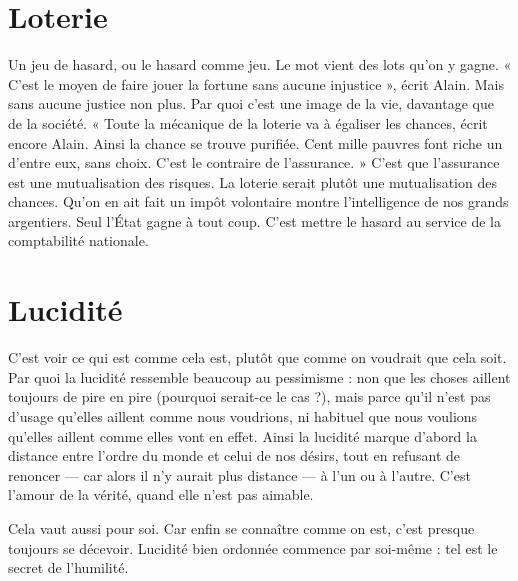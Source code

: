 {\section{Loterie}
Un jeu de hasard, ou le hasard comme jeu. Le mot vient des lots
qu’on y gagne. « C’est le moyen de faire jouer la fortune sans
aucune injustice », écrit Alain. Mais sans aucune justice non plus. Par quoi c’est
une image de la vie, davantage que de la société. « Toute la mécanique de la
loterie va à égaliser les chances, écrit encore Alain. Ainsi la chance se trouve
purifiée. Cent mille pauvres font riche un d’entre eux, sans choix. C’est le
contraire de l'assurance. » C’est que l’assurance est une mutualisation des
risques. La loterie serait plutôt une mutualisation des chances. Qu’on en ait fait
un impôt volontaire montre l'intelligence de nos grands argentiers. Seul l’État
gagne à tout coup. C’est mettre le hasard au service de la comptabilité nationale.

\section{Lucidité}
C'est voir ce qui est comme cela est, plutôt que comme on voudrait
que cela soit. Par quoi la lucidité ressemble beaucoup au
pessimisme : non que les choses aillent toujours de pire en pire (pourquoi
serait-ce le cas ?), mais parce qu’il n’est pas d’usage qu’elles aillent comme nous
voudrions, ni habituel que nous voulions qu’elles aillent comme elles vont en
effet. Ainsi la lucidité marque d’abord la distance entre l’ordre du monde et
celui de nos désirs, tout en refusant de renoncer — car alors il n’y aurait plus distance
— à l’un ou à l’autre. C’est l'amour de la vérité, quand elle n’est pas
aimable.

Cela vaut aussi pour soi. Car enfin se connaître comme on est, c’est presque
toujours se décevoir. Lucidité bien ordonnée commence par soi-même : tel est
le secret de l'humilité.

}
